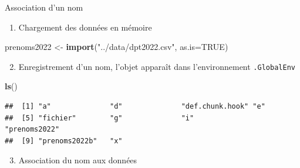 \documentclass[
  ignorenonframetext,
]{beamer}
\newenvironment{Shaded}{\begin{snugshade}}{\end{snugshade}}
\newcommand{\AttributeTok}[1]{\textcolor[rgb]{0.13,0.29,0.53}{#1}}
\newcommand{\ConstantTok}[1]{\textcolor[rgb]{0.56,0.35,0.01}{#1}}
\newcommand{\FunctionTok}[1]{\textcolor[rgb]{0.13,0.29,0.53}{\textbf{#1}}}
\newcommand{\NormalTok}[1]{#1}
\newcommand{\OtherTok}[1]{\textcolor[rgb]{0.56,0.35,0.01}{#1}}
\newcommand{\StringTok}[1]{\textcolor[rgb]{0.31,0.60,0.02}{#1}}
\providecommand{\tightlist}{%
  \setlength{\itemsep}{0pt}\setlength{\parskip}{0pt}}
\begin{document}
\begin{frame}[fragile]{Association d'un nom}
\protect\hypertarget{association-dun-nom}{}
\begin{enumerate}
\tightlist
\item
  Chargement des données en mémoire
\end{enumerate}

\tiny

\begin{Shaded}
\begin{Highlighting}[]
\NormalTok{prenoms2022 }\OtherTok{\textless{}{-}} \FunctionTok{import}\NormalTok{(}\StringTok{"../data/dpt2022.csv"}\NormalTok{, }\AttributeTok{as.is=}\ConstantTok{TRUE}\NormalTok{)}
\end{Highlighting}
\end{Shaded}

\normalsize

\begin{enumerate}
\setcounter{enumi}{1}
\tightlist
\item
  Enregistrement d'un nom, l'objet apparaît dans l'environnement
  \texttt{.GlobalEnv}
\end{enumerate}

\tiny

\begin{Shaded}
\begin{Highlighting}[]
\FunctionTok{ls}\NormalTok{()}
\end{Highlighting}
\end{Shaded}

\begin{verbatim}
##  [1] "a"              "d"              "def.chunk.hook" "e"             
##  [5] "fichier"        "g"              "i"              "prenoms2022"   
##  [9] "prenoms2022b"   "x"
\end{verbatim}

\normalsize

\begin{enumerate}
\setcounter{enumi}{2}
\tightlist
\item
  Association du nom aux données
\end{enumerate}
\end{frame}
\end{document}
